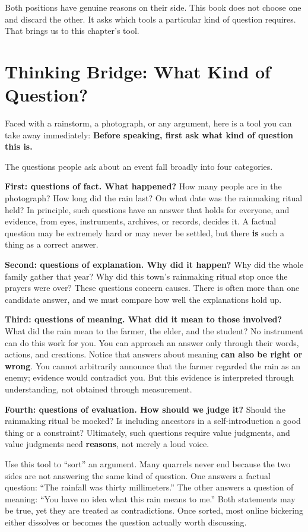 Both positions have genuine reasons on their side. This book does not choose one and discard the other. It asks which tools a particular kind of question requires. That brings us to this chapter's tool.

\section{Thinking Bridge: What Kind of Question?}
Faced with a rainstorm, a photograph, or any argument, here is a tool you can take away immediately: \textbf{Before speaking, first ask what kind of question this is.}

The questions people ask about an event fall broadly into four categories.

\textbf{First: questions of fact. What happened?} How many people are in the photograph? How long did the rain last? On what date was the rainmaking ritual held? In principle, such questions have an answer that holds for everyone, and evidence, from eyes, instruments, archives, or records, decides it. A factual question may be extremely hard or may never be settled, but there \textbf{is} such a thing as a correct answer.

\textbf{Second: questions of explanation. Why did it happen?} Why did the whole family gather that year? Why did this town's rainmaking ritual stop once the prayers were over? These questions concern causes. There is often more than one candidate answer, and we must compare how well the explanations hold up.

\textbf{Third: questions of meaning. What did it mean to those involved?} What did the rain mean to the farmer, the elder, and the student? No instrument can do this work for you. You can approach an answer only through their words, actions, and creations. Notice that answers about meaning \textbf{can also be right or wrong}. You cannot arbitrarily announce that the farmer regarded the rain as an enemy; evidence would contradict you. But this evidence is interpreted through understanding, not obtained through measurement.

\textbf{Fourth: questions of evaluation. How should we judge it?} Should the rainmaking ritual be mocked? Is including ancestors in a self-introduction a good thing or a constraint? Ultimately, such questions require value judgments, and value judgments need \textbf{reasons}, not merely a loud voice.

Use this tool to ``sort'' an argument. Many quarrels never end because the two sides are not answering the same kind of question. One answers a factual question: ``The rainfall was thirty millimeters.'' The other answers a question of meaning: ``You have no idea what this rain means to me.'' Both statements may be true, yet they are treated as contradictions. Once sorted, most online bickering either dissolves or becomes the question actually worth discussing.

